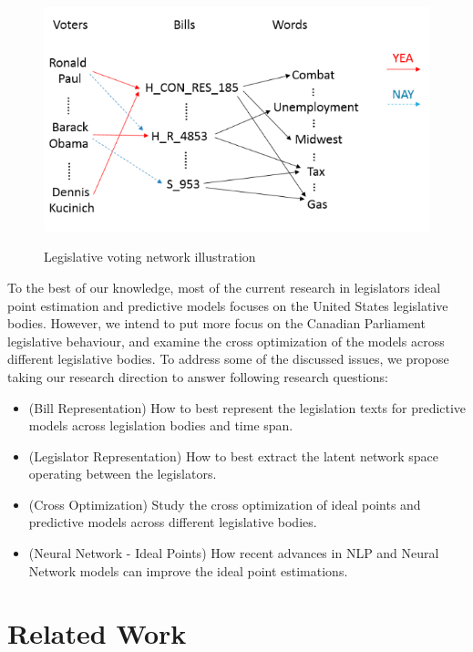 \begin{figure}[H]
\centering
\caption{Legislative voting network illustration}
\includegraphics[scale=.5]{img/legistlativeVotingNetwork.png}
\label{fig:legistlativeVotingNetwork}
\end{figure}


To the best of our knowledge, most of the current research in legislators ideal point estimation and predictive models focuses on the United States legislative bodies. However, we intend to put more focus on the Canadian Parliament legislative behaviour, and examine the cross optimization of the models across different legislative bodies. To address some of the discussed issues, we propose taking our research direction to answer following research questions:

\begin{itemize}[noitemsep]
    \item (Bill Representation) How to best represent the legislation texts for predictive models across legislation bodies and time span. 
    \item (Legislator Representation) How to best extract the latent network space operating between the legislators.
    \item (Cross Optimization) Study the cross optimization of ideal points and predictive models across different legislative bodies. 
    \item (Neural Network - Ideal Points) How recent advances in NLP and Neural Network models can improve the ideal point estimations. 
\end{itemize}


\section{Related Work}


